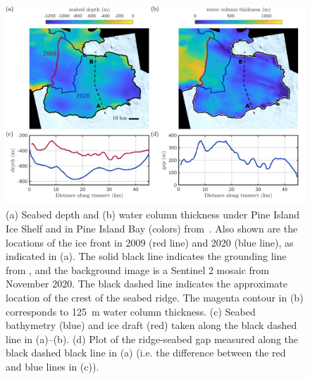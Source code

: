 \documentclass[draft]{agujournal2019}
\begin{document}
\begin{figure}
    \centering
    \includegraphics[width = \textwidth]{../make_figures/plots/figure1_withColumnThickness.pdf}
    \caption{(a) Seabed depth and (b) water column thickness under Pine Island Ice Shelf and in Pine Island Bay (colors) from~. Also shown are the locations of the ice front in 2009 (red line) and 2020 (blue line), as indicated in (a).  The solid black line indicates the grounding line from , and the background image is a Sentinel 2 mosaic from November 2020. The black dashed line indicates the approximate location of the crest of the seabed ridge. The magenta contour in (b) corresponds to 125~m  water column thickness. (c) Seabed bathymetry (blue) and ice draft (red) taken along the black dashed line in (a)--(b). (d) Plot of the ridge-seabed gap measured along the black dashed black line in (a) (i.e. the difference between the red and blue lines in (c)). }
    \label{fig:figure1}
\end{figure}
\end{document}
